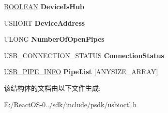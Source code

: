 \begin{DoxyCompactItemize}
\hyperlink{_processor_bind_8h_a112e3146cb38b6ee95e64d85842e380a}{B\+O\+O\+L\+E\+AN} {\bfseries Device\+Is\+Hub}
\item 
\mbox{\label{struct___u_s_b___n_o_d_e___c_o_n_n_e_c_t_i_o_n___i_n_f_o_r_m_a_t_i_o_n_aea48f0df9f89de38929b15eb9348c584}} 
U\+S\+H\+O\+RT {\bfseries Device\+Address}
\item 
\mbox{\label{struct___u_s_b___n_o_d_e___c_o_n_n_e_c_t_i_o_n___i_n_f_o_r_m_a_t_i_o_n_a0eadefb7a7f6fd579fbb373beafe795f}} 
U\+L\+O\+NG {\bfseries Number\+Of\+Open\+Pipes}
\item 
\mbox{\label{struct___u_s_b___n_o_d_e___c_o_n_n_e_c_t_i_o_n___i_n_f_o_r_m_a_t_i_o_n_a26efd37204f4c49b971f4a6b146808e0}} 
U\+S\+B\+\_\+\+C\+O\+N\+N\+E\+C\+T\+I\+O\+N\+\_\+\+S\+T\+A\+T\+US {\bfseries Connection\+Status}
\item 
\mbox{\label{struct___u_s_b___n_o_d_e___c_o_n_n_e_c_t_i_o_n___i_n_f_o_r_m_a_t_i_o_n_a79ebc7738ab2ce22c516d04ec56bb5e7}} 
\hyperlink{struct___u_s_b___p_i_p_e___i_n_f_o}{U\+S\+B\+\_\+\+P\+I\+P\+E\+\_\+\+I\+N\+FO} {\bfseries Pipe\+List} \mbox{[}A\+N\+Y\+S\+I\+Z\+E\+\_\+\+A\+R\+R\+AY\mbox{]}
\end{DoxyCompactItemize}


该结构体的文档由以下文件生成\+:\begin{DoxyCompactItemize}
\item 
E\+:/\+React\+O\+S-\/0../sdk/include/psdk/usbioctl.\+h\end{DoxyCompactItemize}
